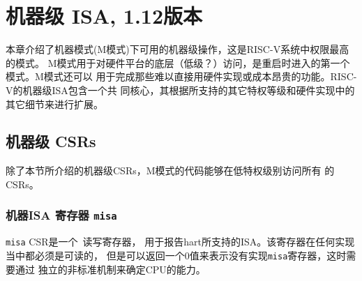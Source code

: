 \chapter{机器级 ISA, 1.12版本}
\label{machine}
\iffalse
This chapter describes the machine-level operations available in
machine-mode (M-mode), which is the highest privilege mode in a RISC-V
system.  M-mode is used for low-level access to a
hardware platform and is the first mode entered at reset.  M-mode can
also be used to implement features that are too difficult or expensive
to implement in hardware directly.  The RISC-V machine-level ISA
contains a common core that is extended depending on which other
privilege levels are supported and other details of the hardware
implementation.
\fi
本章介绍了机器模式(M模式)下可用的机器级操作，这是RISC-V系统中权限最高的模式。
M模式用于对硬件平台的底层（低级？）访问，是重启时进入的第一个模式。M模式还可以
用于完成那些难以直接用硬件实现或成本昂贵的功能。RISC-V的机器级ISA包含一个共
同核心，其根据所支持的其它特权等级和硬件实现中的其它细节来进行扩展。

\section{机器级 CSRs}

\iffalse
In addition to the machine-level CSRs described in this section,
M-mode code can access all CSRs at lower privilege levels.
\fi
除了本节所介绍的机器级CSRs，M模式的代码能够在低特权级别访问所有
的CSRs。 

\subsection{机器ISA 寄存器 {\tt misa}}
\label{sec:misa}

\iffalse
The {\tt misa} CSR is a \warl\ read-write register
reporting the ISA supported by the hart.  This register must be
readable in any implementation, but a value of zero can be returned to
indicate the {\tt misa} register has not been implemented, requiring
that CPU capabilities be determined through a separate non-standard
mechanism.
\fi
{\tt misa} CSR是一个\warl\ 读写寄存器，
用于报告hart所支持的ISA。该寄存器在任何实现当中都必须是可读的，
但是可以返回一个0值来表示没有实现{\tt misa}寄存器，这时需要通过
独立的非标准机制来确定CPU的能力。

